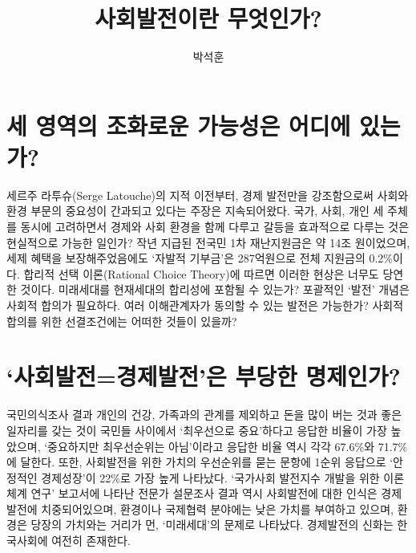 \documentclass[graybox]{svmult}
\begin{document}
\title*{사회발전이란 무엇인가?}
\author{박석훈}
%
%
\maketitle

\section{세 영역의 조화로운 가능성은 어디에 있는가?}
세르주 라투슈(Serge Latouche)의 지적 이전부터, 경제 발전만을 강조함으로써 사회와 환경 부문의 중요성이 간과되고 있다는 주장은 지속되어왔다. 국가, 사회, 개인 세 주체를 동시에 고려하면서 경제와 사회 환경을 함께 다루고 갈등을 효과적으로 다루는 것은 현실적으로 가능한 일인가?  작년 지급된 전국민 1차 재난지원금은 약 14조 원이었으며, 세제 혜택을 보장해주었음에도 `자발적 기부금'은 287억원으로 전체 지원금의 0.2\%이다. 합리적 선택 이론(Rational Choice Theory)에 따르면 이러한 현상은 너무도 당연한 것이다. 미래세대를 현재세대의 합리성에 포함될 수 있는가? 포괄적인 `발전' 개념은 사회적 합의가 필요하다. 여러 이해관계자가 동의할 수 있는 발전은 가능한가? 사회적 합의를 위한 선결조건에는 어떠한 것들이 있을까?

\section{`사회발전=경제발전'은 부당한 명제인가?}
  국민의식조사 결과 개인의 건강, 가족과의 관계를 제외하고 돈을 많이 버는 것과 좋은 일자리를 갖는 것이 국민들 사이에서 `최우선으로 중요'하다고 응답한 비율이 가장 높았으며, `중요하지만 최우선순위는 아님'이라고 응답한 비율 역시 각각 67.6\%와 71.7\%에 달한다. 또한, 사회발전을 위한 가치의 우선순위를 묻는 문항에 1순위 응답으로 `안정적인 경제성장'이 22\%로 가장 높게 나타났다. `국가사회 발전지수 개발을 위한 이론체계 연구' 보고서에 나타난 전문가 설문조사 결과 역시 사회발전에 대한 인식은 경제발전에 치중되어있으며, 환경이나 국제협력 분야에는 낮은 가치를 부여하고 있으며, 환경은 당장의 가치와는 거리가 먼, `미래세대'의 문제로 나타났다. 경제발전의 신화는 한국사회에 여전히 존재한다. \\
 
\end{document}
